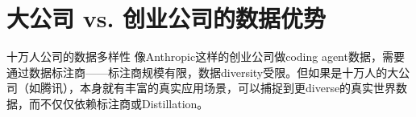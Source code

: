 \section{大公司 vs. 创业公司的数据优势}

\begin{knowledgebox}{十万人公司的数据多样性}
像Anthropic这样的创业公司做coding agent数据，需要通过数据标注商——标注商规模有限，数据diversity受限。但如果是十万人的大公司（如腾讯），本身就有丰富的真实应用场景，可以捕捉到更diverse的真实世界数据，而不仅仅依赖标注商或Distillation。
\end{knowledgebox}


